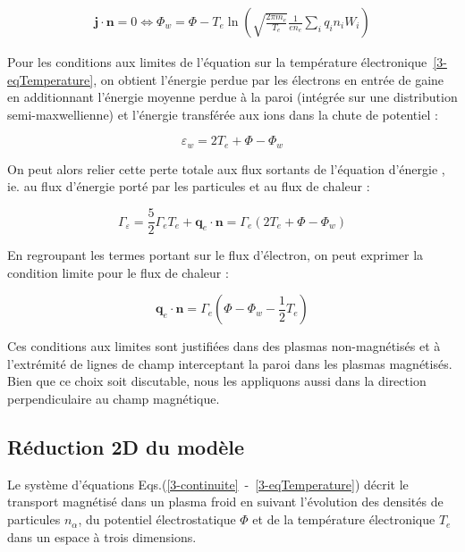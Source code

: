 \begin{refsection}
\begin{equation}\begin{split}
\mathbf j\cdot\mathbf{n}=0\Leftrightarrow
\Phi_w=\Phi-T_e\ln\left(\sqrt{\frac{2\pi
m_e}{T_e}}\frac{1}{en_e}\sum_iq_in_iW_i\right)
\end{split}\end{equation}

Pour les conditions aux limites de l'équation sur la température
électronique~\eqref{3-eqTemperature}, on obtient l'énergie perdue par les
électrons en entrée de gaine en additionnant l'énergie moyenne perdue à la paroi (intégrée sur une distribution semi-maxwellienne) et l'énergie transférée aux ions dans la chute de potentiel :

\begin{equation}
	\varepsilon_w=2T_e+\Phi-\Phi_w
\end{equation}
 
 On peut alors relier cette perte totale aux flux sortants de l'équation
 d'énergie , ie. au flux d'énergie porté
 par les particules et au flux de chaleur :
 
\begin{equation}
\Gamma_\varepsilon=\frac{5}{2}{\Gamma}_eT_e+\mathbf{q}_e\cdot\mathbf{n}=
\Gamma_e\left(2T_e+\Phi-\Phi_w\right)
\end{equation}

En regroupant les termes portant sur le flux d'électron, on peut exprimer la
condition limite pour le flux de chaleur :

\begin{equation}
\mathbf{q}_e\cdot\mathbf{n}=\Gamma_e\left(\Phi-\Phi_w-\frac{1}{2}T_e\right)
\end{equation}

Ces conditions aux limites sont justifiées dans des plasmas non-magnétisés et à l'extrémité
de lignes de champ interceptant la paroi dans les plasmas magnétisés. Bien
que ce choix soit discutable, nous les appliquons aussi dans la direction
perpendiculaire au champ magnétique.


\subsection{Réduction 2D du modèle}

Le système d'équations Eqs.(\ref{3-continuite}~-~\ref{3-eqTemperature}) décrit le
transport magnétisé dans un plasma froid en suivant l'évolution des densités de
particules $n_\alpha$, du potentiel électrostatique $\Phi$ et de la
température électronique $T_e$ dans un espace à trois dimensions. 


\end{refsection}
